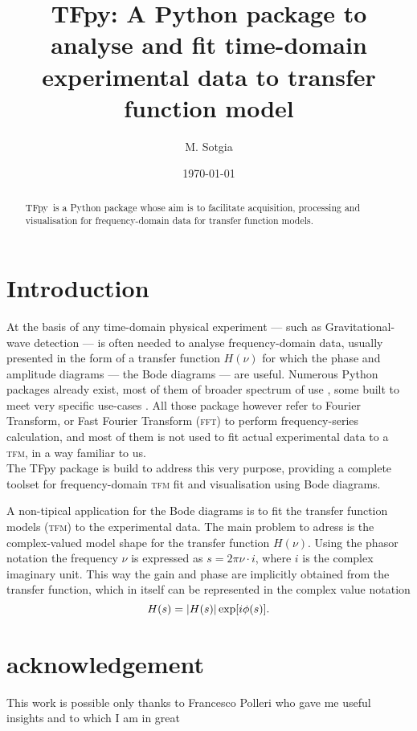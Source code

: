 \documentclass[reprint,preprintnumbers,showkeys,prb,citeautoscript]{revtex4-1}
\newcommand\tfm{{\scshape tfm}}
\newcommand\tfpy{TFpy}
\begin{document}
\preprint{\tfpy-v0.1.0$\alpha$-PREPRINT}

\title{\tfpy: A Python package to analyse and fit time-domain experimental data to transfer function model}
\author{M. Sotgia}
\date{\today}
\begin{abstract}
\tfpy\ is a Python package whose aim is to facilitate acquisition, processing and visualisation for frequency-domain data for transfer function models. 
\end{abstract}

\maketitle

\section{Introduction}

At the basis of any time-domain physical experiment --- such as Gravitational-wave detection --- is often needed to analyse frequency-domain data, usually presented in the form of a transfer function $H(\nu)$ for which the phase and amplitude diagrams --- the Bode diagrams --- are useful. Numerous Python packages already exist, most of them of broader spectrum of use \cite{2020SciPy-NMeth,pythoncontrol}, some built to meet very specific use-cases \cite{gwpy,kontrol}. All those package however refer to Fourier Transform, or Fast Fourier Transform ({\scshape fft}) to perform frequency-series calculation, and most of them is not used to fit actual experimental data to a \tfm, in a way familiar to us. \\ The \tfpy{} package is build to address this very purpose, providing a complete toolset for frequency-domain \tfm{} fit and visualisation using Bode diagrams. 

A non-tipical application for the Bode diagrams is to fit the transfer function models (\tfm) to the experimental data. The main problem to adress is the complex-valued model shape for the transfer function $H(\nu)$. Using the phasor notation the frequency $\nu$ is expressed as $s=2\pi\nu\cdot i$, where $i$ is the complex imaginary unit. This way the gain and phase are implicitly obtained from the transfer function, which in itself can be represented in the complex value notation \[H(s) = \abs{H(s)}\exp[i\phi(s)].\]


\section*{acknowledgement}
This work is possible only thanks to Francesco Polleri who gave me useful insights and to which I am in great 


\end{document}
